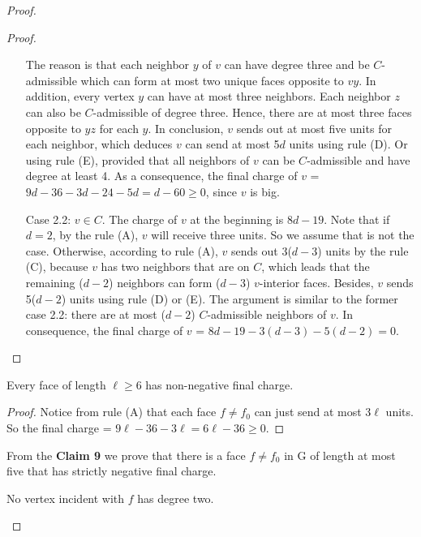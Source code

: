\begin{proof}
\begin{proof}
\begin{itemize}
    The reason is that each neighbor $y$ of $v$ can have degree three and be $C$-admissible which can form at most two unique faces opposite to $vy$. In addition, every vertex $y$ can have at most three neighbors. Each neighbor $z$ can also be $C$-admissible of degree three. Hence, there are at most three faces opposite to $yz$ for each $y$. In conclusion, $v$ sends out at most five units for each neighbor, which deduces $v$ can send at most 5$d$ units using rule (D). Or using rule (E), provided that all neighbors of $v$ can be $C$-admissible and have degree at least 4. As a consequence, the final charge of $v$ = $9d -36 - 3d - 24 - 5d = d - 60 \geq 0$, since $v$ is big.
    \item[Case 2.2:] \textit{\textbf{$v \in C.$}} The charge of $v$ at the beginning is $8d - 19$. Note that if $d = 2$, by the rule (A), $v$ will receive three units. So we assume that is not the case. Otherwise, according to rule (A), $v$ sends out 3($d-3$) units by the rule (C), because $v$ has two neighbors that are on $C$, which leads that the remaining ($d-2$) neighbors can form ($d - 3$) $v$-interior faces. Besides, $v$ sends 5($d - 2$) units using rule (D) or (E). The argument is similar to the former case 2.2: there are at most ($d-2$) $C$-admissible neighbors of $v$. In consequence, the final charge of $v$ = $8d - 19 - 3(d - 3) - 5(d - 2) = 0$.
\end{itemize}
\end{proof}

\begin{claim}
Every face of length $\ell \geq 6$ has non-negative final charge.
\end{claim}
\begin{proof}
Notice from rule (A) that each face $f \ne f_0$ can just send at most 3$\ell$ units. So the final charge = $9\ell - 36 - 3\ell = 6\ell - 36 \geq 0$. 
\end{proof}
From the \textbf{Claim 9} we prove that there is a face $f \ne f_0$ in G of length at most five that has strictly negative final charge.

\begin{corollary}
No vertex incident with $f$ has degree two. \cite{dvorak2013threecoloring}
\end{corollary}


\end{proof}
